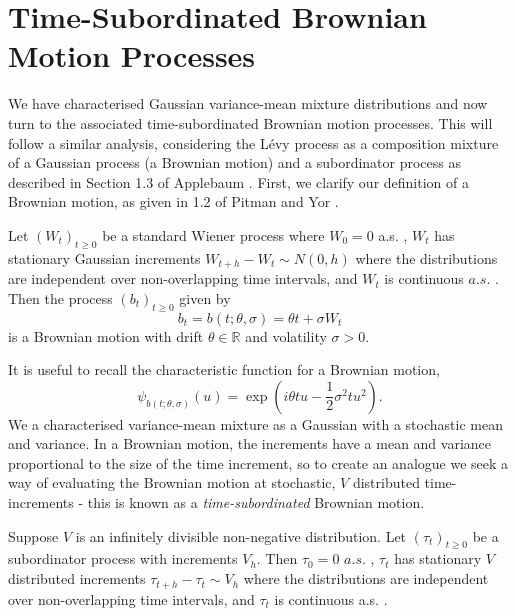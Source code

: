 \documentclass{article}
\begin{document}
\section{Time-Subordinated Brownian Motion Processes}\label{SectionTSBM}

\label{SectionVGProcess}
We have characterised Gaussian variance-mean mixture distributions and now turn to the associated time-subordinated Brownian motion processes. This will follow a similar analysis, considering the Lévy process as a composition mixture of a Gaussian process (a Brownian motion) and a subordinator process as described in Section 1.3 of Applebaum \cite{Applebaum}. First, we clarify our definition of a Brownian motion, as given in 1.2 of Pitman and Yor \cite{pitmanyor}.
\begin{definition}\label{Brownian}
    Let $(W_t)_{t\geq0}$ be a standard Wiener process where $W_0 = 0$ a.s. , $W_t$ has stationary Gaussian increments $W_{t+h} - W_t \sim N(0, h)$ where the distributions are independent over non-overlapping time intervals, and $W_t$ is continuous $a.s.$ . Then the process $(b_t)_{t\geq0}$ given by
    \begin{equation}\label{Brownian motion}
        b_t = b(t;\theta, \sigma) = \theta t + \sigma W_t
    \end{equation}
    is a Brownian motion with drift $\theta\in\mathbb{R}$ and volatility $\sigma>0$.
\end{definition}
\noindent It is useful to recall the characteristic function for a Brownian motion,
\begin{equation}\label{bmcf}
    \psi_{b(t;\theta,\sigma)}(u) = \exp\left(i\theta tu -\frac{1}{2}\sigma^2t u^2 \right).
\end{equation}
We a characterised variance-mean mixture as a Gaussian with a stochastic mean and variance. In a Brownian motion, the increments have a mean and variance proportional to the size of the time increment, so to create an analogue we seek a way of evaluating the Brownian motion at stochastic, $V$ distributed time-increments - this is known as a \textit{time-subordinated} Brownian motion.
\begin{definition}\label{Gamprocess}
    Suppose $V$ is an infinitely divisible non-negative distribution. Let $(\tau_t)_{t\geq0}$ be a subordinator process with increments $V_h$. Then $\tau_0 = 0$ $a.s.$ , $\tau_t$ has stationary $V$ distributed increments $\tau_{t+h}-\tau_t\sim V_h$ where the distributions are independent over non-overlapping time intervals, and $\tau_t$ is continuous a.s. .
\end{definition}
\end{document}
